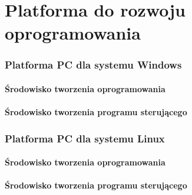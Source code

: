 \newpage
\part{Platforma do rozwoju oprogramowania}
\section{Platforma PC dla systemu Windows}
\subsection{Środowisko tworzenia oprogramowania}
\subsection{Środowisko tworzenia programu sterującego}
\section{Platforma PC dla systemu Linux}
\subsection{Środowisko tworzenia oprogramowania}
\subsection{Środowisko tworzenia programu sterującego}
